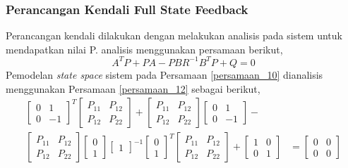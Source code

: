 \documentclass[../main.tex]{subfiles}
\begin{document}
            \subsubsection{Perancangan Kendali Full State Feedback}
            Perancangan kendali dilakukan dengan melakukan analisis pada sistem untuk mendapatkan  nilai P. analisis menggunakan persamaan berikut,
            \begin{equation}
                A^T P+PA-PBR^{-1} B^T P+Q = 0
                \label{persamaan_12}
            \end{equation}
            Pemodelan \textit{state space} sistem pada Persamaan \eqref{persamaan_10} dianalisis menggunakan Persamaan \eqref{persamaan_12} sebagai berikut,
            \begin{equation}
                \begin{split}
                    \begin{bmatrix} 0 & 1 \\ 0 & -1 \end{bmatrix}^T \begin{bmatrix} P_{11} & P_{12} \\ P_{12} & P_{22} \end{bmatrix} + \begin{bmatrix} P_{11} & P_{12} \\ P_{12} & P_{22}\end{bmatrix} \begin{bmatrix} 0 & 1 \\ 0 & -1 \end{bmatrix} - &\\ \begin{bmatrix} P_{11} & P_{12} \\ P_{12} & P_{22} \end{bmatrix} \begin{bmatrix} 0 \\ 1 \end{bmatrix} \begin{bmatrix} 1 \end{bmatrix}^{-1} \begin{bmatrix} 0 \\ 1 \end{bmatrix}^T \begin{bmatrix} P_{11} & P_{12} \\ P_{12} & P_{22} \end{bmatrix} + \begin{bmatrix} 1 & 0 \\ 0 & 1 \end{bmatrix} &= \begin{bmatrix} 0 & 0 \\ 0 & 0 \end{bmatrix}\\[5pt]

\end{split}
\end{equation}
\end{document}
